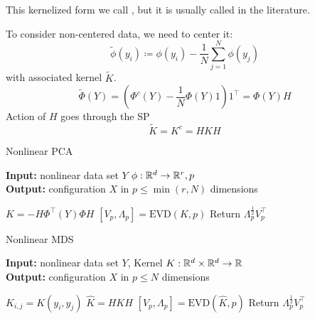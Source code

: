 This kernelized form we call , but it is usually called 
 in the literature. 

To consider non-centered data, we need to center it: 
\[\tilde{\phi}(y_i)\coloneqq \phi(y_i)-\frac{1}{N}\sum_{j=1}^N\phi(y_j)\]
with associated kernel $\tilde{K}$.
\[\tilde{\Phi}(Y)=(\Phi^c(Y)-\frac{1}{N}\Phi(Y)1)1^\intercal = \Phi(Y)H\]
Action of $H$ goes through the SP 
\[\tilde{K}=K^c=HKH\]
\begin{algorithm}[H] 
    \caption{Nonlinear PCA}\label{alg:nl_pca}
 \textbf{Input:}  nonlinear data set $Y$ $\phi:\mathbb{R}^d\to\mathbb{R}^r,p$\\
 \textbf{Output:} configuration $X$ in $p\leq \min(r,N)$ dimensions
 \begin{algorithmic}
   \State $K=-H\Phi^\intercal(Y)\Phi H$
   \State $[V_p,\Lambda_p]=\text{EVD}(K,p)$
   \State Return $\Lambda_p^{\frac{1}{2}} V_p^\intercal$
 \end{algorithmic}
\end{algorithm}

\begin{algorithm}[H] 
    \caption{Nonlinear MDS}\label{alg:nl_mds}
 \textbf{Input:}  nonlinear data set $Y$, Kernel $K:\mathbb{R}^d\times\mathbb{R}^d\to\mathbb{R}$\\
 \textbf{Output:} configuration $X$ in $p\leq N$ dimensions
 \begin{algorithmic}
   \State $K_{i,j}=K(y_i,y_j)$
   \State $\hat{K}=HKH$
   \State $[V_p,\Lambda_p]=\text{EVD}(\hat{K},p)$
   \State Return $\Lambda_p^{\frac{1}{2}} V_p^\intercal$
 \end{algorithmic}
\end{algorithm}

